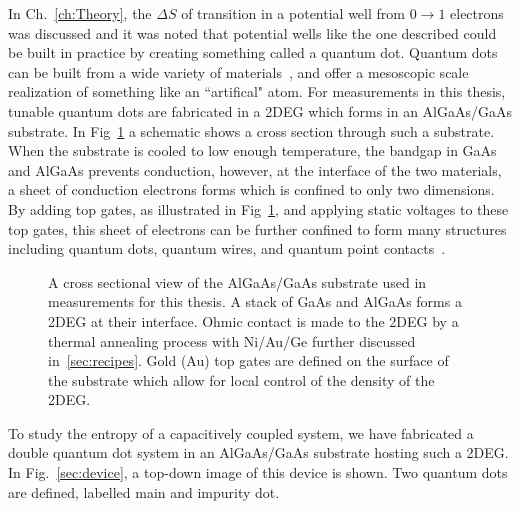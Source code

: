 In Ch.~\ref{ch:Theory}, the $\Delta S$ of transition in a potential well from $0 \to 1$ electrons was discussed and it was noted that potential wells like the one described could be built in practice by creating something called a quantum dot. Quantum dots can be built from a wide variety of materials~\cite{bera2010quantum}, and offer a mesoscopic scale realization of something like an ``artifical" atom. For measurements in this thesis, tunable quantum dots are fabricated in a \ac{2DEG} which forms in an AlGaAs/GaAs substrate. In Fig~\ref{fig:qd1} a schematic shows a cross section through such a substrate. When the substrate is cooled to low enough temperature, the bandgap in GaAs and AlGaAs prevents conduction, however, at the interface of the two materials, a sheet of conduction electrons forms which is confined to only two dimensions. By adding top gates, as illustrated in Fig~\ref{fig:qd1}, and applying static voltages to these top gates, this sheet of electrons can be further confined to form many structures including quantum dots, quantum wires, and quantum point contacts~\cite{manfra2014molecular}. 
\begin{figure}[h]
\centering
{}
\caption{A cross sectional view of the AlGaAs/GaAs substrate used in measurements for this thesis. A stack of GaAs and AlGaAs forms a \ac{2DEG} at their interface. Ohmic contact is made to the \ac{2DEG} by a thermal annealing process with Ni/Au/Ge further discussed in~\ref{sec:recipes}. Gold (Au) top gates are defined on the surface of the substrate which allow for local control of the density of the \ac{2DEG}.}
\label{fig:qd1}       %
\end{figure}

To study the entropy of a capacitively coupled system, we have fabricated a double quantum dot system in an AlGaAs/GaAs substrate hosting such a \ac{2DEG}. In Fig.~\ref{sec:device}, a top-down image of this device is shown. Two quantum dots are defined, labelled main and impurity dot. 

